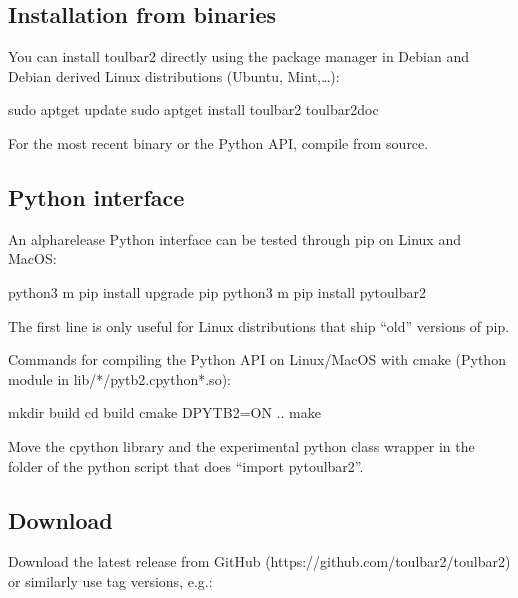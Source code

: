 \documentclass[letterpaper,10pt,openany,oneside,english]{sphinxmanual}
\begin{document}
\subsection{Installation from binaries}
\label{\detokenize{_files/README:installation-from-binaries}}\label{\detokenize{_files/README:readme-2}}
\sphinxAtStartPar
You can install toulbar2 directly using the package manager in Debian
and Debian derived Linux distributions (Ubuntu, Mint,…):

\begin{sphinxVerbatim}[commandchars=\\\{\}]
sudo apt\PYGZhy{}get update
sudo apt\PYGZhy{}get install toulbar2 toulbar2\PYGZhy{}doc
\end{sphinxVerbatim}

\sphinxAtStartPar
For the most recent binary or the Python API, compile from source.


\subsection{Python interface}
\label{\detokenize{_files/README:python-interface}}\label{\detokenize{_files/README:readme-3}}
\sphinxAtStartPar
An alpha\sphinxhyphen{}release Python interface can be tested through pip on Linux and MacOS:

\begin{sphinxVerbatim}[commandchars=\\\{\}]
python3 \PYGZhy{}m pip install \PYGZhy{}\PYGZhy{}upgrade pip
python3 \PYGZhy{}m pip install pytoulbar2
\end{sphinxVerbatim}

\sphinxAtStartPar
The first line is only useful for Linux distributions that ship “old” versions of pip.

\sphinxAtStartPar
Commands for compiling the Python API on Linux/MacOS with cmake (Python module in lib/*/pytb2.cpython*.so):

\begin{sphinxVerbatim}[commandchars=\\\{\}]
mkdir build
cd build
cmake \PYGZhy{}DPYTB2=ON ..
make
\end{sphinxVerbatim}

\sphinxAtStartPar
Move the cpython library and the experimental  python class wrapper in the folder of the python script that does “import pytoulbar2”.


\subsection{Download}
\label{\detokenize{_files/README:download}}\label{\detokenize{_files/README:readme-4}}
\sphinxAtStartPar
Download the latest release from GitHub
(https://github.com/toulbar2/toulbar2) or similarly use tag versions,
e.g.:
\end{document}
